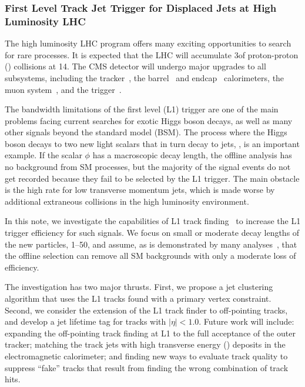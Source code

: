 \subsubsection{First Level Track Jet Trigger for Displaced Jets at High Luminosity LHC}

The high luminosity LHC program offers many exciting opportunities to search for rare processes. It is expected that the
LHC will accumulate 3\abinv of proton-proton (\pp) collisions at 14\UTeV.
The CMS detector will undergo major upgrades to all subsystems, including the tracker~\cite{cmstdr-014},
the barrel~\cite{cmstdr-barrel} and endcap~\cite{cmstdr-ec} calorimeters, the muon system~\cite{cmstdr-mu},
and the trigger~\cite{cmstdr-017}. 

The bandwidth limitations of the first level (L1) trigger
are one of the main problems facing current searches 
for exotic Higgs boson decays, as well as many other signals beyond the standard model (BSM).
The process where the Higgs boson decays to two new light scalars that in turn decay to jets, \Hphiphi, is an important example. If the scalar $\phi$ has a
macroscopic decay length, the offline analysis has no background from SM processes, but the majority of the signal events do not get recorded because they fail to be selected by the L1 trigger.
The main obstacle is the high rate for low transverse momentum jets, which is made worse by additional extraneous \pp collisions in the
high luminosity environment.

In this note, we investigate the capabilities of L1 track finding~\cite{cmstdr-014} to increase the L1 trigger efficiency for such signals.
We focus on small or moderate decay lengths of the new particles, 1--50\Umm, and assume, as is demonstrated by
many analyses~\cite{ll1, ll2, ll3}, that the offline selection can remove all SM backgrounds with only a moderate loss of efficiency.

The investigation has two major thrusts. First, we propose a jet clustering algorithm that uses the L1 tracks found with a primary vertex constraint.
Second, we consider the extension of the L1
track finder to off-pointing tracks, and develop a jet lifetime tag for tracks with $|\eta| < 1.0$. 
Future work will include: expanding the off-pointing track finding at L1 to the full acceptance of the outer tracker;
matching the track jets with high transverse energy (\ET) deposits in the electromagnetic calorimeter; and finding new ways to evaluate
track quality to suppress ``fake'' tracks that result from finding the wrong combination of track hits. 

